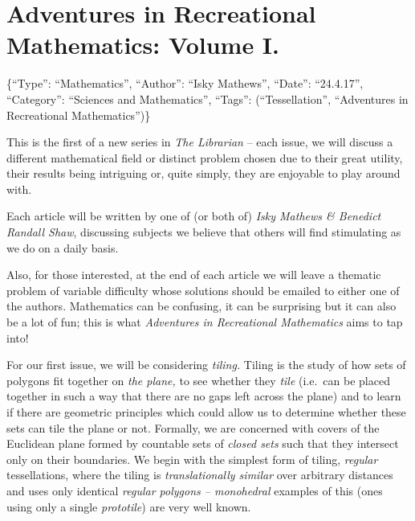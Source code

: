 \section{Adventures in Recreational Mathematics: Volume
I.}\label{adventures-in-recreational-mathematics-volume-i.}

\{``Type'': ``Mathematics'', ``Author'': ``Isky Mathews'', ``Date'':
``24.4.17'', ``Category'': ``Sciences and Mathematics'', ``Tags'':
(``Tessellation'', ``Adventures in Recreational Mathematics'')\}

This is the first of a new series in \emph{The Librarian} -- each issue,
we will discuss a different mathematical field or distinct problem
chosen due to their great utility, their results being intriguing or,
quite simply, they are enjoyable to play around with.

Each article will be written by one of (or both of) \emph{Isky Mathews
\& Benedict Randall Shaw}, discussing subjects we believe that others
will find stimulating as we do on a daily basis.

Also, for those interested, at the end of each article we will leave a
thematic problem of variable difficulty whose solutions should be
emailed to either one of the authors. Mathematics can be confusing, it
can be surprising but it can also be a lot of fun; this is what
\emph{Adventures in Recreational Mathematics} aims to tap into!

For our first issue, we will be considering \emph{tiling.} Tiling is the
study of how sets of polygons fit together on \emph{the plane,} to see
whether they \emph{tile} (i.e.~can be placed together in such a way that
there are no gaps left across the plane) and to learn if there are
geometric principles which could allow us to determine whether these
sets can tile the plane or not. Formally, we are concerned with covers
of the Euclidean plane formed by countable sets of \emph{closed sets}
such that they intersect only on their boundaries. We begin with the
simplest form of tiling, \emph{regular} tessellations, where the tiling
is \emph{translationally similar} over arbitrary distances and uses only
identical \emph{regular polygons -- monohedral} examples of this (ones
using only a single \emph{prototile}) are very well known.

